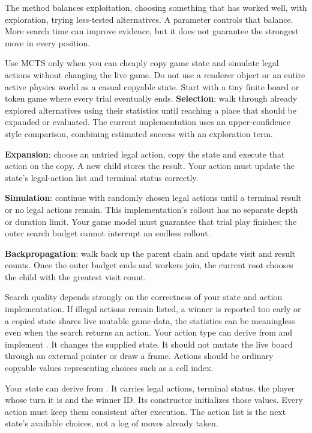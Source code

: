 \documentclass[11pt,a4paper]{article}
\begin{document}
The method balances exploitation, choosing something that has worked well, with exploration, trying less-tested alternatives. A parameter controls that balance. More search time can improve evidence, but it does not guarantee the strongest move in every position.

Use MCTS only when you can cheaply copy game state and simulate legal actions without changing the live game. Do not use a renderer object or an entire active physics world as a casual copyable state. Start with a tiny finite board or token game where every trial eventually ends.
\textbf{Selection}: walk through already explored alternatives using their statistics until reaching a place that should be expanded or evaluated. The current implementation uses an upper-confidence style comparison, combining estimated success with an exploration term.

\textbf{Expansion}: choose an untried legal action, copy the state and execute that action on the copy. A new child stores the result. Your action must update the state's legal-action list and terminal status correctly.

\textbf{Simulation}: continue with randomly chosen legal actions until a terminal result or no legal actions remain. This implementation's rollout has no separate depth or duration limit. Your game model must guarantee that trial play finishes; the outer search budget cannot interrupt an endless rollout.

\textbf{Backpropagation}: walk back up the parent chain and update visit and result counts. Once the outer budget ends and workers join, the current root chooses the child with the greatest visit count.

Search quality depends strongly on the correctness of your state and action implementation. If illegal actions remain listed, a winner is reported too early or a copied state shares live mutable game data, the statistics can be meaningless even when the search returns an action.
Your action type can derive from  and implement . It changes the supplied state. It should not mutate the live board through an external pointer or draw a frame. Actions should be ordinary copyable values representing choices such as a cell index.

Your state can derive from . It carries legal actions, terminal status, the player whose turn it is and the winner ID. Its constructor initializes those values. Every action must keep them consistent after execution. The action list is the next state's available choices, not a log of moves already taken.
\end{document}
